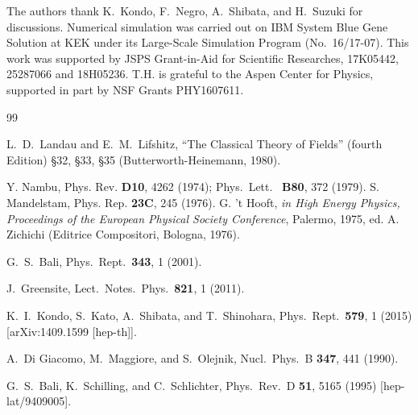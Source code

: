 \documentclass[3p,twocolumn,sort&compress]{elsarticle}
\begin{document}
The authors thank K.~Kondo, F.~Negro, A.~Shibata, and H.~Suzuki for discussions.
Numerical simulation was carried out on IBM System Blue Gene Solution
at KEK under its Large-Scale Simulation Program (No.~16/17-07).
This work was supported by JSPS Grant-in-Aid for Scientific Researches,
  17K05442, 25287066 and 18H05236. T.H. is grateful to the Aspen Center for Physics, 
supported in part by NSF Grants PHY1607611.

\begin{thebibliography}{99}
  
L.~D.~Landau and E.~M.~Lifshitz,  
 ``The Classical Theory of Fields'' (fourth Edition) {\S 32}, {\S 33}, {\S 35} 
 (Butterworth-Heinemann, 1980).


Y. Nambu,  Phys. Rev. {\bf D10}, 4262 (1974);
 Phys.\ Lett. \ {\bf B80}, 372 (1979).
%
 S. Mandelstam, Phys. Rep. {\bf 23C}, 245 (1976).
%
G. 't Hooft, {\it in High Energy Physics, Proceedings of the European Physical Society
Conference}, Palermo, 1975, ed. A. Zichichi (Editrice Compositori, Bologna, 1976).



G.~S.~Bali,
  Phys.\ Rept.\  {\bf 343}, 1 (2001).
	
  J.~Greensite,
  Lect.\ Notes.\ Phys.\ {\bf 821}, 1 (2011).


  K.~I.~Kondo, S.~Kato, A.~Shibata, and T.~Shinohara,
  Phys.\ Rept.\  {\bf 579}, 1 (2015)
  [arXiv:1409.1599 [hep-th]].
	


  A.~Di Giacomo, M.~Maggiore, and S.~Olejnik,
  Nucl.\ Phys.\ B {\bf 347}, 441 (1990).


  G.~S.~Bali, K.~Schilling, and C.~Schlichter,
  Phys.\ Rev.\ D {\bf 51}, 5165 (1995)
  [hep-lat/9409005].



\end{thebibliography}
\end{document}
